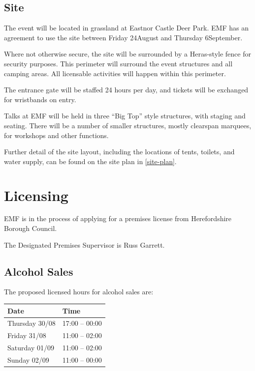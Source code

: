 \subsection{Site}
The event will be located in grassland at Eastnor Castle Deer Park. EMF has an
agreement to use the site between Friday 24\th August and Thursday
6\th September.

Where not otherwise secure, the site will be surrounded by a Heras-style fence
for security purposes.  This perimeter will surround the event structures and all
camping areas. All licensable activities will happen within this perimeter.

The entrance gate will be staffed 24 hours per day, and tickets will be
exchanged for wristbands on entry.

Talks at EMF will be held in three ``Big Top'' style structures, with staging and
seating. There will be a number of smaller structures, mostly clearspan marquees,
for workshops and other functions.

Further detail of the site layout, including the locations of tents, toilets,
and water supply, can be found on the site plan in \cref{site-plan}.

\newpage

\section{Licensing}

EMF is in the process of applying for a premises license from Herefordshire
Borough Council.

The Designated Premises Supervisor is Russ Garrett.

\subsection{Alcohol Sales}

The proposed licensed hours for alcohol sales are:

\begin{table}[h!]
    \centering
    \begin{tabular}{| l l |}
        \hline
        \textbf{Date} & \textbf{Time} \\
        \hline
        Thursday 30/08 & 17:00 -- 00:00 \\
        Friday 31/08 & 11:00 -- 02:00 \\
        Saturday 01/09 & 11:00 -- 02:00 \\
        Sunday 02/09 & 11:00 -- 00:00 \\
        \hline
    \end{tabular}
    \centering
\end{table}

